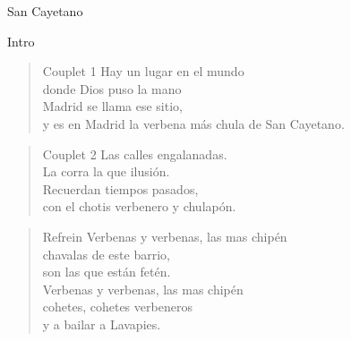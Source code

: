 \begin{song}{San Cayetano}
\begin{instrumental}{Intro}
   \measure{}
   \measure{}
   \hspace{3em} \measure{}
   
\end{instrumental}

\begin{verse}{Couplet 1}
Hay un lugar en el mundo\\
donde Dios puso la mano\\
\chord{}Madrid se llama ese sitio,\\
y es en Madrid la verbena m\'{a}s chula de San Cayetano.\\
\end{verse}

\begin{verse}{Couplet 2}
Las calles engalanadas.\\
La corra la que ilusi\'{o}n.\\
Recuerdan tiempos pasados,\\
con el chotis verbenero y chulap\'{o}n.\hspace{1.75em}\\
\end{verse}

\begin{verse}{Refrein}
Verbenas y verbenas, las mas chip\'{e}n\\
\chord{}chavalas de este barrio,\\
son las que est\'{a}n fet\'{e}n.\\
Verbenas y verbenas, las mas chip\'{e}n\\
cohetes, cohetes verbeneros\\
y a bailar a Lavapies.\hspace{1.75em}\\
\end{verse}

\end{song}
